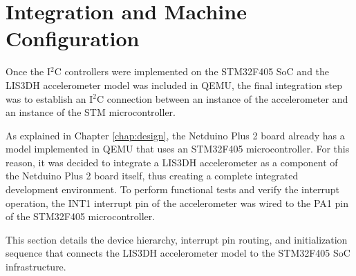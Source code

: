 \section{Integration and Machine Configuration}
\label{sec:impl_machine}

Once the I$^2$C controllers were implemented on the STM32F405 SoC and the LIS3DH accelerometer model was included in QEMU, the final integration step was to establish an I$^2$C connection between an instance of the accelerometer and an instance of the STM microcontroller.

As explained in Chapter \ref{chap:design}, the Netduino Plus 2 board already has a model implemented in QEMU that uses an STM32F405 microcontroller. For this reason, it was decided to integrate a LIS3DH accelerometer as a component of the Netduino Plus 2 board itself, thus creating a complete integrated development environment. To perform functional tests and verify the interrupt operation, the INT1 interrupt pin of the accelerometer was wired to the PA1 pin of the STM32F405 microcontroller.

This section details the device hierarchy, interrupt pin routing, and initialization sequence that connects the LIS3DH accelerometer model to the STM32F405 SoC infrastructure.






%